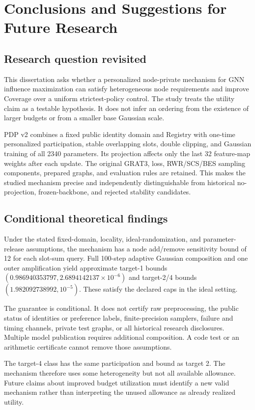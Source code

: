\chapter{Conclusions and Suggestions for Future Research}\label{ch:conclusion}
\section{Research question revisited}
This dissertation asks whether a personalized node-private mechanism for GNN influence maximization can satisfy heterogeneous node requirements and improve Coverage over a uniform strictest-policy control. The study treats the utility claim as a testable hypothesis. It does not infer an ordering from the existence of larger budgets or from a smaller base Gaussian scale.

PDP v2 combines a fixed public identity domain and Registry with one-time personalized participation, stable overlapping slots, double clipping, and Gaussian training of all 2340 parameters. Its projection affects only the last 32 feature-map weights after each update. The original GRAT3, loss, RWR/SCS/BES sampling components, prepared graphs, and evaluation rules are retained. This makes the studied mechanism precise and independently distinguishable from historical no-projection, frozen-backbone, and rejected stability candidates.

\section{Conditional theoretical findings}
Under the stated fixed-domain, locality, ideal-randomization, and parameter-release assumptions, the mechanism has a node add/remove sensitivity bound of 12 for each slot-sum query. Full 100-step adaptive Gaussian composition and one outer amplification yield approximate target-1 bounds $(0.986940353797,2.6894142137\times10^{-6})$ and target-2/4 bounds $(1.982092738992,10^{-5})$. These satisfy the declared caps in the ideal setting.

The guarantee is conditional. It does not certify raw preprocessing, the public status of identities or preference labels, finite-precision samplers, failure and timing channels, private test graphs, or all historical research disclosures. Multiple model publication requires additional composition. A code test or an arithmetic certificate cannot remove those assumptions.

The target-4 class has the same participation and bound as target 2. The mechanism therefore uses some heterogeneity but not all available allowance. Future claims about improved budget utilization must identify a new valid mechanism rather than interpreting the unused allowance as already realized utility.

